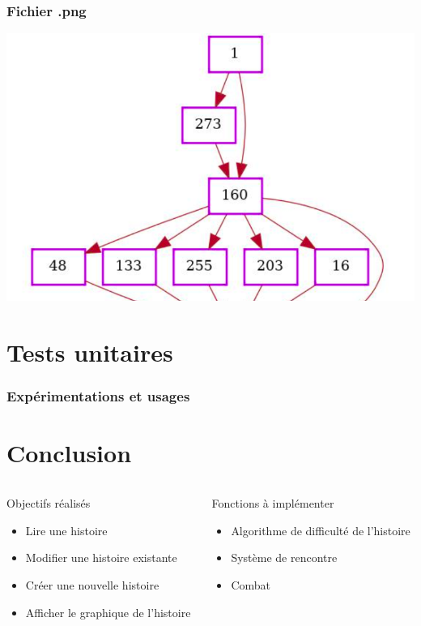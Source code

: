\documentclass{beamer}
\begin{document}
\begin{frame}
\frametitle{Fichier .png}

\begin{center}
\includegraphics[scale=0.4]{./images/graph.png}
\end{center}

\end{frame}
\section{Tests unitaires}
\begin{frame}
\frametitle{Expérimentations et usages}
\end{frame}
\section{Conclusion}
\begin{frame}
\begin{columns}
\begin{column}{5cm}
Objectifs réalisés
\newline
\begin{itemize}
    \item[\ding{47}] Lire une histoire
 	\item[\ding{47}] Modifier une histoire existante
 	\item[\ding{47}] Créer une nouvelle histoire
 	\item[\ding{47}] Afficher le graphique de l'histoire
\end{itemize}
\end{column}
\begin{column}{4cm}
Fonctions à implémenter
\newline
\begin{itemize}
    \item[\ding{47}] Algorithme de difficulté de l'histoire
 	\item[\ding{47}] Système de rencontre
 	\item[\ding{47}] Combat
\end{itemize}
\end{column}
\end{columns}
\end{frame}
\end{document}

